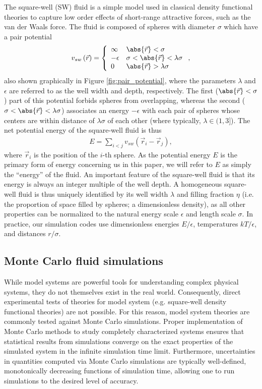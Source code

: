 \documentclass[11pt]{article}
\newcommand{\p}[1]{\left(#1\right)} %
\begin{document}
The square-well (SW) fluid is a simple model used in classical density
functional theories to capture low order effects of short-range
attractive forces, such as the van der Waals force. The fluid is
composed of spheres with diameter $\sigma$ which have a pair potential
\begin{align}
  v_{sw}\p{\vec r}=\left\{
    \begin{array}{ll}
      \infty & \abs{\vec r}<\sigma \\
      -\epsilon & \sigma<\abs{\vec r}<\lambda\sigma \\
      0 & \abs{\vec r}>\lambda\sigma
    \end{array}
  \right., \label{eq:pair_potential}
\end{align}
also shown graphically in Figure \ref{fig:pair_potential}, where the
parameters $\lambda$ and $\epsilon$ are referred to as the well width
and depth, respectively. The first ($\abs{\vec r}<\sigma$) part of
this potential forbids spheres from overlapping, whereas the second
($\sigma<\abs{\vec r}<\lambda\sigma$) associates an energy $-\epsilon$
with each pair of spheres whose centers are within distance of
$\lambda\sigma$ of each other (where typically, $\lambda\in(1,3]$).
The net potential energy of the square-well fluid is thus
\begin{align}
  E=\sum_{i<j}v_{sw}\p{\vec r_i-\vec r_j},
  \label{eq:internal_energy}
\end{align}
where $\vec r_i$ is the position of the $i$-th sphere. As the
potential energy $E$ is the primary form of energy concerning us in
this paper, we will refer to $E$ as simply the ``energy'' of the
fluid. An important feature of the square-well fluid is that its
energy is always an integer multiple of the well depth. A homogeneous
square-well fluid is thus uniquely identified by its well width
$\lambda$ and filling fraction $\eta$ (i.e. the proportion of space
filled by spheres; a dimensionless density), as all other properties
can be normalized to the natural energy scale $\epsilon$ and length
scale $\sigma$. In practice, our simulation codes use dimensionless
energies $E/\epsilon$, temperatures $kT/\epsilon$, and distances
$r/\sigma$.

\subsection{Monte Carlo fluid simulations}
\label{sec:mc_sim}

While model systems are powerful tools for understanding complex
physical systems, they do not themselves exist in the real
world. Consequently, direct experimental tests of theories for model
system (e.g. square-well density functional theories) are not
possible. For this reason, model system theories are commonly tested
against Monte Carlo simulations. Proper implementation of Monte Carlo
methods to study completely characterized systems ensures that
statistical results from simulations converge on the exact properties
of the simulated system in the infinite simulation time
limit. Furthermore, uncertainties in quantities computed via Monte
Carlo simulations are typically well-defined, monotonically decreasing
functions of simulation time, allowing one to run simulations to the
desired level of accuracy.
\end{document}
